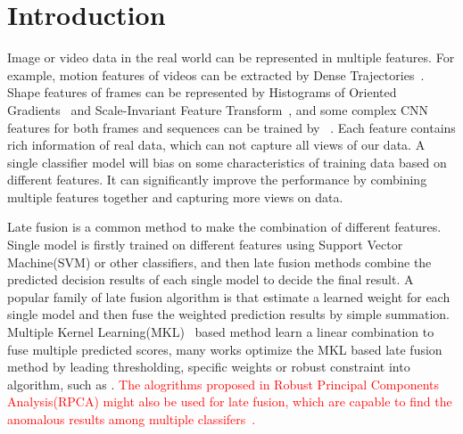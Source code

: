 \documentclass[letterpaper]{article}
\def\yanred{\textcolor{red}}
\begin{document}
\section{Introduction}

Image or video data in the real world can be represented in multiple features.
For example, motion features of videos can be extracted by Dense Trajectories~\cite{Wang2011Action}.
Shape features of frames can be represented by Histograms of Oriented Gradients~\cite{dalal2005histograms} and Scale-Invariant Feature Transform~\cite{lowe2004distinctive}, and some complex CNN features for both frames and sequences can be trained by ~\cite{szegedy2015going,chatfield2014return,he2015deep,simonyan2014two,Xu_2015_CVPR}.
Each feature contains rich information of real data, which can not capture all views of our data.
A single classifier model will bias on some characteristics of training data based on different features.
It can significantly improve the performance by combining multiple features together and capturing more views on data.


Late fusion is a common method to make the combination of different features. Single model is firstly trained on different features using Support Vector Machine(SVM) or other classifiers, and then late fusion methods combine the predicted decision results of each single model to decide the final result.
A popular family of late fusion algorithm is that estimate a learned weight for each single model and then fuse the weighted prediction results by simple summation. Multiple Kernel Learning(MKL)~\cite{lanckriet2004learning,Rakotomamonjy2008Simplemkl} based method learn a linear combination to fuse multiple predicted scores, many works optimize the MKL based late fusion method by leading thresholding, specific weights or robust constraint into algorithm, such as \cite{gehler2009feature,xuiccv2013feature,lai2015learning}.
\yanred{The alogrithms proposed in Robust Principal Components Analysis(RPCA) might also be used for late fusion, which are capable to find the anomalous results among multiple classifers~\cite{gaoijcai2016robust}. }
\end{document}
